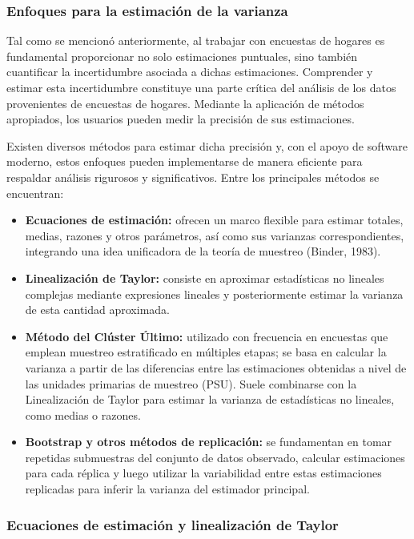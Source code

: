 \documentclass[
  12pt,
]{book}
\begin{document}
\subsubsection{Enfoques para la estimación de la varianza}\label{enfoques-para-la-estimaciuxf3n-de-la-varianza}

Tal como se mencionó anteriormente, al trabajar con encuestas de hogares es fundamental proporcionar no solo estimaciones puntuales, sino también cuantificar la incertidumbre asociada a dichas estimaciones. Comprender y estimar esta incertidumbre constituye una parte crítica del análisis de los datos provenientes de encuestas de hogares. Mediante la aplicación de métodos apropiados, los usuarios pueden medir la precisión de sus estimaciones.

Existen diversos métodos para estimar dicha precisión y, con el apoyo de software moderno, estos enfoques pueden implementarse de manera eficiente para respaldar análisis rigurosos y significativos. Entre los principales métodos se encuentran:

\begin{itemize}
\item
  \textbf{Ecuaciones de estimación:} ofrecen un marco flexible para estimar totales, medias, razones y otros parámetros, así como sus varianzas correspondientes, integrando una idea unificadora de la teoría de muestreo (Binder, 1983).
\item
  \textbf{Linealización de Taylor:} consiste en aproximar estadísticas no lineales complejas mediante expresiones lineales y posteriormente estimar la varianza de esta cantidad aproximada.
\item
  \textbf{Método del Clúster Último:} utilizado con frecuencia en encuestas que emplean muestreo estratificado en múltiples etapas; se basa en calcular la varianza a partir de las diferencias entre las estimaciones obtenidas a nivel de las unidades primarias de muestreo (PSU). Suele combinarse con la Linealización de Taylor para estimar la varianza de estadísticas no lineales, como medias o razones.
\item
  \textbf{Bootstrap y otros métodos de replicación:} se fundamentan en tomar repetidas submuestras del conjunto de datos observado, calcular estimaciones para cada réplica y luego utilizar la variabilidad entre estas estimaciones replicadas para inferir la varianza del estimador principal.
\end{itemize}

\subsubsection*{Ecuaciones de estimación y linealización de Taylor}\label{ecuaciones-de-estimaciuxf3n-y-linealizaciuxf3n-de-taylor}
\end{document}
